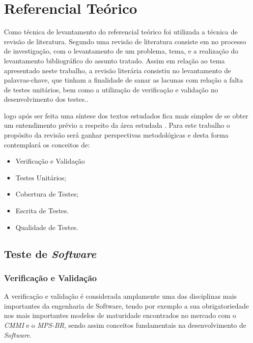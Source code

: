 \chapter{Referencial Teórico}

	Como técnica de levantamento do referencial teórico foi utilizada a técnica de revisão de literatura. Segundo  uma revisão de literatura consiste em no processo de investigação, com o levantamento de um problema, tema, e a realização do levantamento bibliográfico  do assunto tratado. Assim em relação ao tema apresentado neste trabalho, a revisão literária consistiu no levantamento de palavras-chave, que tinham a finalidade de  sanar as lacunas com relação a falta de testes unitários, bem como a utilização de verificação e validação no desenvolvimento dos testes..

    logo após ser feita uma síntese dos textos estudados fica mais simples de se obter um entendimento prévio a respeito da área estudada  .
    Para este trabalho o propósito da revisão será ganhar perspectivas metodológicas e desta forma contemplará os conceitos de:

    \begin{itemize}

        \item Verificação e Validação
        \item Testes Unitários;
        \item Cobertura de Testes;
        \item Escrita de Testes.
        \item Qualidade de Testes.
    \end{itemize}

\vfill
\pagebreak

\section{Teste de \textit{Software}}
   
\subsection{Verificação e Validação}

A verificação e validação é considerada amplamente uma das disciplinas mais importantes da engenharia de Software, tendo por exemplo a sua obrigatoriedade nos mais importantes modelos de maturidade encontrados no mercado com o \textit{CMMI} e o \textit{MPS-BR}, sendo assim conceitos fundamentais na desenvolvimento de \textit{Software}.


